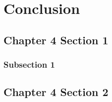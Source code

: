\chapter{Conclusion}

\section{Chapter 4 Section 1}
\subsection{Subsection 1}
\section{Chapter 4 Section 2}
